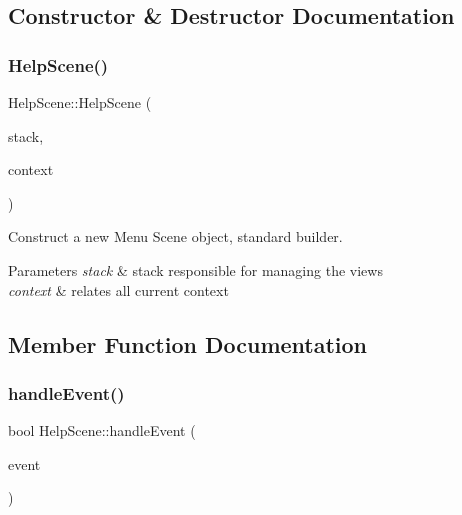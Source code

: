 \subsection{Constructor \& Destructor Documentation}
\mbox{\label{classHelpScene_a97b066a6f6341021d0bc07a548ec3f6c}} 
\subsubsection{\texorpdfstring{Help\+Scene()}{HelpScene()}}
{\footnotesize\ttfamily Help\+Scene\+::\+Help\+Scene (\begin{DoxyParamCaption}\item[{\hyperlink{classStateManager}{State\+Manager} \&}]{stack,  }\item[{\hyperlink{structState_1_1Context}{Context}}]{context }\end{DoxyParamCaption})}



Construct a new Menu Scene object, standard builder. 


\begin{DoxyParams}{Parameters}
{\em stack} & stack responsible for managing the views \\
\hline
{\em context} & relates all current context \\
\hline
\end{DoxyParams}


\subsection{Member Function Documentation}
\mbox{\label{classHelpScene_adebdd5586b2e0c618134d5bfc38f821b}} 
\subsubsection{\texorpdfstring{handle\+Event()}{handleEvent()}}
{\footnotesize\ttfamily bool Help\+Scene\+::handle\+Event (\begin{DoxyParamCaption}\item[{const sf\+::\+Event \&}]{event }\end{DoxyParamCaption})\hspace{0.3cm}{\ttfamily [virtual]}}



